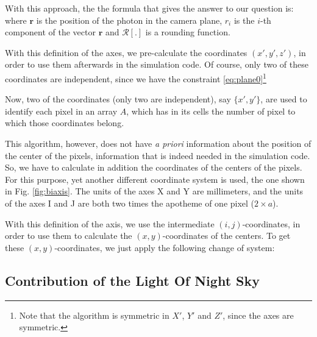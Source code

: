 With this approach, the the formula that gives the answer to our
question is:
%
\hexgrideq
%
where $\mathbf{r}$ is the position of the photon in the camera plane,
$r_i$ is the $i$-th component of the vector $\mathbf{r}$ and
$\mathcal{R}[\mathord{.}]$ is a rounding function.

\axesfigs


With this definition of the axes, we pre-calculate the coordinates
$(x',y',z')$, in order to use them afterwards in the simulation code.
Of course, only two of these coordinates are independent, since we
have the constraint \eqref{eq:plane0}\footnote{Note that the algorithm
  is symmetric in $X'$, $Y'$ and $Z'$, since the axes are symmetric.}
  
Now, two of the coordinates (only two are independent), say
$\{x',y'\}$, are used to identify each pixel in an array $A$, which
has in its cells the number of pixel to which those coordinates
belong.

This algorithm, however, does not have {\itshape a priori} information
about the position of the center of the pixels, information that is
indeed needed in the simulation code. So, we have to calculate in
addition the coordinates of the centers of the pixels. For this
purpose, yet another different coordinate system is used, the one
shown in Fig. \ref{fig:biaxis}. The units of the axes X and Y are
millimeters, and the units of the axes I and J are both two times the
apotheme of one pixel ($2 \times a$).


With this definition of the axis, we use the intermediate
$(i,j)$-coordinates, in order to use them to calculate the
$(x,y)$-coordinates of the centers. To get these $(x,y)$-coordinates,
we just apply the following change of system:
%
\bitoeucleq

\afterpage{\clearpage}

\subsection{Contribution of the Light Of Night Sky}
\label{ssec:LONS}

